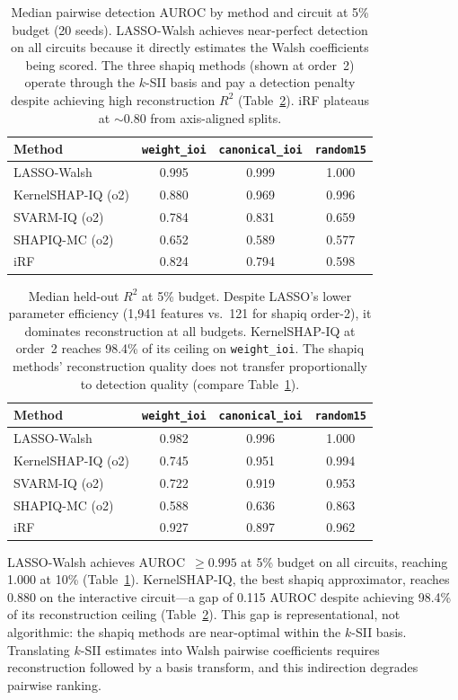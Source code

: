 \documentclass[10pt]{article}
\begin{document}
\begin{table}[t]
\centering
\caption{Median pairwise detection AUROC by method and circuit at 5\%
budget (20 seeds). LASSO-Walsh achieves near-perfect detection on all
circuits because it directly estimates the Walsh coefficients being
scored. The three shapiq methods (shown at order~2) operate through
the $k$-SII basis and pay a detection penalty despite achieving high
reconstruction $R^2$ (Table~\ref{tab:r2}). iRF plateaus at
$\sim$0.80 from axis-aligned splits.}
\label{tab:auroc}
\begin{tabular}{lccc}
\toprule
Method & \texttt{weight\_ioi} & \texttt{canonical\_ioi} & \texttt{random15} \\
\midrule
LASSO-Walsh        & 0.995 & 0.999 & 1.000 \\
KernelSHAP-IQ (o2) & 0.880 & 0.969 & 0.996 \\
SVARM-IQ (o2)      & 0.784 & 0.831 & 0.659 \\
SHAPIQ-MC (o2)     & 0.652 & 0.589 & 0.577 \\
iRF                & 0.824 & 0.794 & 0.598 \\
\bottomrule
\end{tabular}
\end{table}

\begin{table}[t]
\centering
\caption{Median held-out $R^2$ at 5\% budget. Despite LASSO's lower
parameter efficiency (1{,}941 features vs.\ 121 for shapiq order-2),
it dominates reconstruction at all budgets. KernelSHAP-IQ at order~2
reaches 98.4\% of its ceiling on \texttt{weight\_ioi}. The shapiq
methods' reconstruction quality does not transfer proportionally to
detection quality (compare Table~\ref{tab:auroc}).}
\label{tab:r2}
\begin{tabular}{lccc}
\toprule
Method & \texttt{weight\_ioi} & \texttt{canonical\_ioi} & \texttt{random15} \\
\midrule
LASSO-Walsh        & 0.982 & 0.996 & 1.000 \\
KernelSHAP-IQ (o2) & 0.745 & 0.951 & 0.994 \\
SVARM-IQ (o2)      & 0.722 & 0.919 & 0.953 \\
SHAPIQ-MC (o2)     & 0.588 & 0.636 & 0.863 \\
iRF                & 0.927 & 0.897 & 0.962 \\
\bottomrule
\end{tabular}
\end{table}

LASSO-Walsh achieves AUROC~$\geq 0.995$ at 5\% budget on all
circuits, reaching 1.000 at 10\% (Table~\ref{tab:auroc}).
KernelSHAP-IQ, the best shapiq approximator, reaches 0.880 on the
interactive circuit---a gap of 0.115 AUROC despite achieving 98.4\%
of its reconstruction ceiling (Table~\ref{tab:r2}). This gap is
representational, not algorithmic: the shapiq methods are
near-optimal within the $k$-SII basis. Translating $k$-SII estimates
into Walsh pairwise coefficients requires reconstruction followed by
a basis transform, and this indirection degrades pairwise ranking.
\end{document}
